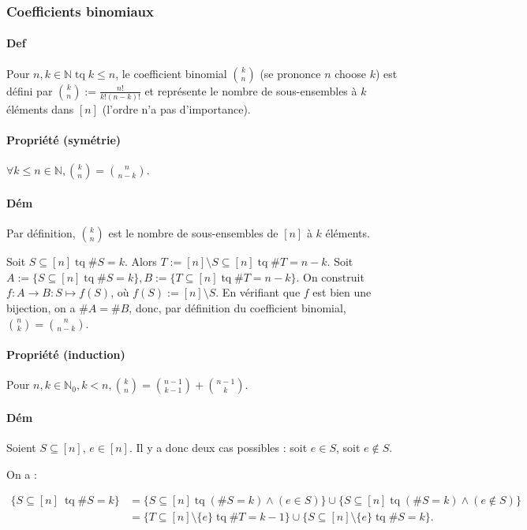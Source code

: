 \documentclass{article}
\DeclareMathOperator{\tq}{\text{ tq }}
\begin{document}
			\subsubsection{Coefficients binomiaux}
			
			\paragraph{Def} Pour $n, k \in \mathbb N \tq k \leq n$, le coefficient binomial $\binom kn$ (se prononce $n$ choose $k$) est défini par
			$\binom kn := \frac {n!}{k!(n-k)!}$ et représente le nombre de sous-ensembles à $k$ éléments dans $[n]$ (l'ordre n'a pas d'importance).
			
			\paragraph{Propriété (symétrie)} $\forall k \leq n \in \mathbb N, \binom kn = \binom n{n-k}$.
			
			\paragraph{Dém} Par définition, $\binom kn$ est le nombre de sous-ensembles de $[n]$ à $k$ éléments.
			
			Soit $S \subseteq [n] \tq \#S = k$. Alors $T := [n] \setminus S \subseteq [n] \tq \#T = n-k$. Soit $A := \{S \subseteq [n] \tq \#S = k\},
			B := \{T \subseteq [n] \tq \#T = n-k\}$. On construit $f : A \to B : S \mapsto f(S)$, où $f(S) := [n] \setminus S$. En vérifiant que $f$ est bien une bijection,
			on a $\#A = \#B$, donc, par définition du coefficient binomial, $\binom nk = \binom n{n-k}$.
			
			\paragraph{Propriété (induction)} Pour $n, k \in \mathbb N_0, k < n, \binom kn = \binom {n-1}{k-1} + \binom{n-1}{k}$.
			
			\paragraph{Dém} Soient $S \subseteq [n]$, $e \in [n]$. Il y a donc deux cas possibles : soit $e \in S$, soit $e \not \in S$.
			
			On a :
			
			\[\begin{aligned}
				\{S \subseteq [n]\ \tq \#S = k\} &= \{S \subseteq [n] \tq (\#S = k) \land (e \in S)\} \cup \{S \subseteq [n] \tq (\#S = k) \land (e \not \in S)\} \\
												 &= \{T \subseteq [n] \setminus \{e\} \tq \#T = k-1\} \cup \{S \subseteq [n] \setminus \{e\} \tq \#S = k\}.
			\end{aligned}\]
			
\end{document}
